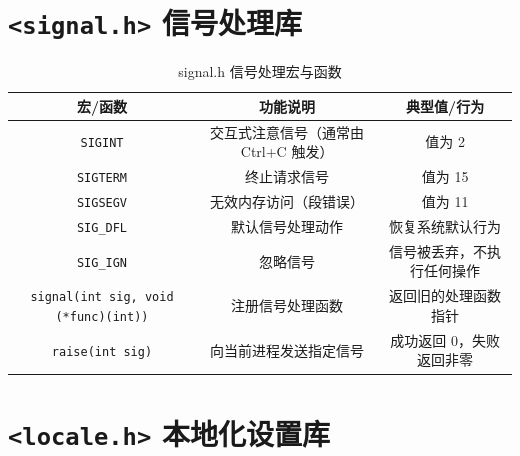 \section{\texorpdfstring{\texttt{<signal.h>} 信号处理库}{<signal.h> 信号处理库}}

\begin{table}[H]
\centering
\small
\renewcommand{\arraystretch}{1.5}
\begin{tabulary}{\linewidth}{CCC}
\toprule
\textbf{宏/函数} & \textbf{功能说明} & \textbf{典型值/行为} \\ \midrule
\texttt{SIGINT} & 交互式注意信号（通常由 Ctrl+C 触发） & 值为 2 \\ 
\texttt{SIGTERM} & 终止请求信号 & 值为 15 \\ 
\texttt{SIGSEGV} & 无效内存访问（段错误） & 值为 11 \\ 
\texttt{SIG\_DFL} & 默认信号处理动作 & 恢复系统默认行为 \\ 
\texttt{SIG\_IGN} & 忽略信号 & 信号被丢弃，不执行任何操作 \\ 
\texttt{signal(int sig, void (*func)(int))} & 注册信号处理函数 & 返回旧的处理函数指针 \\ 
\texttt{raise(int sig)} & 向当前进程发送指定信号 & 成功返回 0，失败返回非零 \\ \bottomrule
\end{tabulary}
\caption{signal.h 信号处理宏与函数}
\label{tab:signal}
\end{table}

\section{\texorpdfstring{\texttt{<locale.h>} 本地化设置库}{<locale.h> 本地化设置库}}

